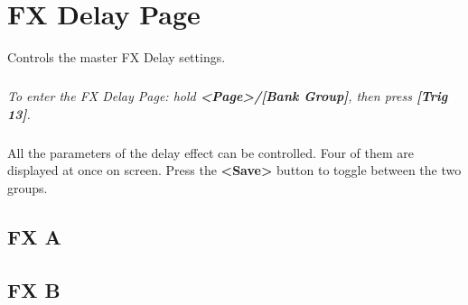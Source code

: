 \chapter{FX Delay Page}
Controls the master FX Delay settings.\\
\vspace{-16pt}
\vspace{-32pt}
\paragraph{}\textit{To enter the FX Delay Page: hold \textbf{<Page>/[Bank Group]}, then press \textbf{[Trig 13]}.}
\vspace{-16pt}
\paragraph{}
All the parameters of the delay effect can be controlled. Four of them are displayed at once on screen. Press the \textbf{<Save>} button to toggle between the two groups.

\vspace{-4pt}
\section{FX A}
\vspace{-16pt}
\vspace{-25pt}
\vspace{-10pt}
\section{FX B}
\vspace{-16pt}
\vspace{-25pt}
\begin{figure}[h!]
\end{figure}

